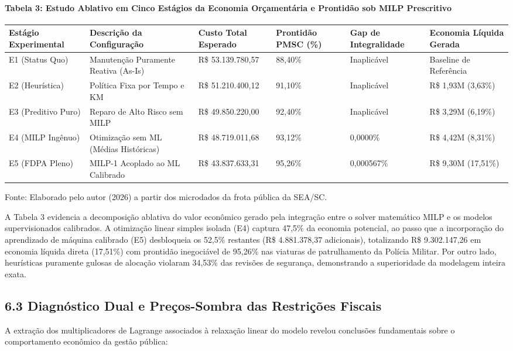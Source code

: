\documentclass[10pt,a4paper,journal]{article}
\begin{document}
\paragraph{Tabela 3: Estudo Ablativo em Cinco Estágios da Economia Orçamentária e Prontidão sob MILP Prescritivo}
\begin{table}[htbp]
\centering
\small
\begin{tabular}{llllll}
\toprule
Estágio Experimental & Descrição da Configuração & Custo Total Esperado & Prontidão PMSC (\%) & Gap de Integralidade & Economia Líquida Gerada \\
\midrule
E1 (Status Quo) & Manutenção Puramente Reativa (As-Is) & R\$ 53.139.780,57 & 88,40\% & Inaplicável & Baseline de Referência \\
E2 (Heurística) & Política Fixa por Tempo e KM & R\$ 51.210.400,12 & 91,10\% & Inaplicável & R\$ 1,93M (3,63\%) \\
E3 (Preditivo Puro) & Reparo de Alto Risco sem MILP & R\$ 49.850.220,00 & 92,40\% & Inaplicável & R\$ 3,29M (6,19\%) \\
E4 (MILP Ingênuo) & Otimização sem ML (Médias Históricas) & R\$ 48.719.011,68 & 93,12\% & 0,0000\% & R\$ 4,42M (8,31\%) \\
E5 (FDPA Pleno) & MILP-1 Acoplado ao ML Calibrado & R\$ 43.837.633,31 & 95,26\% & 0,000567\% & R\$ 9,30M (17,51\%) \\
\bottomrule
\end{tabular}
\end{table}
Fonte: Elaborado pelo autor (2026) a partir dos microdados da frota pública da SEA/SC.

A Tabela 3 evidencia a decomposição ablativa do valor econômico gerado pela integração entre o solver matemático MILP e os modelos supervisionados calibrados. A otimização linear simples isolada (E4) captura 47,5\% da economia potencial, ao passo que a incorporação do aprendizado de máquina calibrado (E5) desbloqueia os 52,5\% restantes (R\$ 4.881.378,37 adicionais), totalizando R\$ 9.302.147,26 em economia líquida direta (17,51\%) com prontidão inegociável de 95,26\% nas viaturas de patrulhamento da Polícia Militar. Por outro lado, heurísticas puramente gulosas de alocação violaram 34,53\% das revisões de segurança, demonstrando a superioridade da modelagem inteira exata.

\subsection{6.3 Diagnóstico Dual e Preços-Sombra das Restrições Fiscais}
A extração dos multiplicadores de Lagrange associados à relaxação linear do modelo revelou conclusões fundamentais sobre o comportamento econômico da gestão pública:
\end{document}
